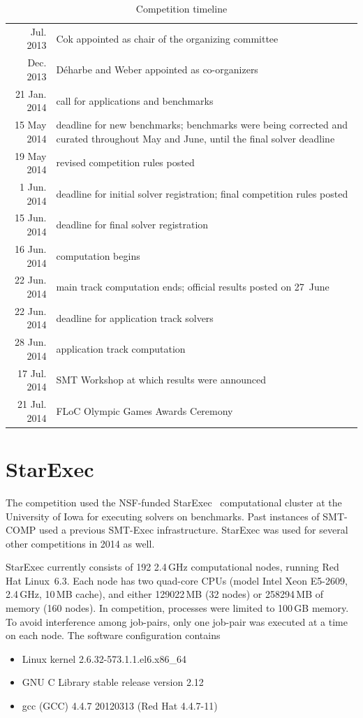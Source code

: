 \documentclass[twoside,11pt]{article}
\begin{document}
\begin{table}
\caption{\label{tab:timeline}Competition timeline}
\begin{tabular}{r |@{\hspace{-2.3pt}$\bullet$ \hspace{5pt}} p{}}
Jul. 2013 & Cok appointed as chair of the organizing committee\\
Dec. 2013 & D\'{e}harbe and Weber appointed as co-organizers\\
21 Jan. 2014 & call for applications and benchmarks\\
15 May 2014 & deadline for new benchmarks; benchmarks were being corrected and curated throughout May and June, until the final solver deadline\\
19 May 2014 & revised competition rules posted\\
1 Jun. 2014 & deadline for initial solver registration; final competition rules posted\\
15 Jun. 2014 & deadline for final solver registration\\
16 Jun. 2014 & computation begins\\
22 Jun. 2014 & main track computation ends; official results posted on 27~June\\
22 Jun. 2014 & deadline for application track solvers\\
28 Jun. 2014 & application track computation\\
17 Jul. 2014 & SMT Workshop at which results were announced\\
21 Jul. 2014 & FLoC Olympic Games Awards Ceremony
\end{tabular}
\end{table}


\section{StarExec}
\label{sec:starexec}

The competition used the NSF-funded StarExec~\cite{DBLP:conf/cade/StumpST14} computational cluster at the University of Iowa for executing solvers on benchmarks. Past instances of SMT-COMP used a previous SMT-Exec infrastructure. StarExec was used for several other competitions in 2014 as well.

StarExec currently consists of 192 2.4\,GHz computational nodes, running Red Hat Linux~6.3. Each node has two quad-core CPUs (model Intel Xeon E5-2609, 2.4\,GHz, 10\,MB cache), and either 129022\,MB (32 nodes) or 258294\,MB of memory (160 nodes). In competition, processes were limited to 100\,GB memory. To avoid interference among job-pairs, only one job-pair was executed at a time on each node. The software configuration contains
\begin{itemize}[noitemsep,nolistsep]
\item Linux kernel 2.6.32-573.1.1.el6.x86\_64
\item GNU C Library stable release version 2.12
\item gcc (GCC) 4.4.7 20120313 (Red Hat 4.4.7-11)
\end{itemize}
\end{document}
